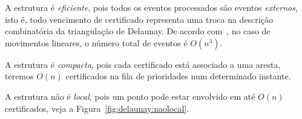 A estrutura é \textit{eficiente}, pois todos os eventos processados são eventos \textit{externos},
isto é, todo vencimento de certificado representa uma troca na descrição combinatória da
triangulação de Delaunay.
De acordo com~\cite{eduardo}, no caso de movimentos lineares, o número total de eventos é
$O(n^3)$.

A estrutura é \textit{compacta}, pois cada certificado está associado a uma aresta, teremos
$O(n)$ certificados na fila de prioridades num determinado instante.

A estrutura não é \textit{local}, pois um ponto pode estar envolvido em até $O(n)$
certificados, veja a Figura~\ref{fig:delaunay:naolocal}.


